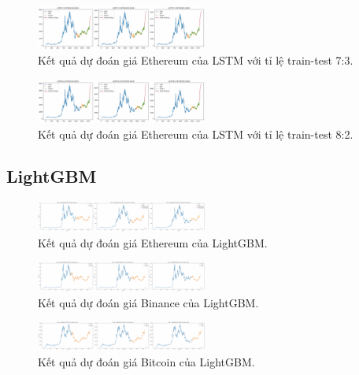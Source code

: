 \documentclass{ieeeojies}
\begin{document}
\begin{figure}[h]
    \centering
    \includegraphics[width=0.5\textwidth]{bibliography/pictures/LSTM 73 ETH.jpg}
    \caption{Kết quả dự đoán giá Ethereum của LSTM với tỉ lệ train-test 7:3.}
\end{figure}
\begin{figure}[h]
    \centering
    \includegraphics[width=0.5\textwidth]{bibliography/pictures/LSTM 82 ETH.jpg}
    \caption{Kết quả dự đoán giá Ethereum của LSTM với tỉ lệ train-test 8:2.}
\end{figure}
\subsection{LightGBM}
\begin{figure}[h]
    \centering
    \includegraphics[width=0.5\textwidth]{bibliography/pictures/LIGHTGBM ETH.jpg}
    \caption{Kết quả dự đoán giá Ethereum của LightGBM.}
\end{figure}
\begin{figure}[h]
    \centering
    \includegraphics[width=0.5\textwidth]{bibliography/pictures/LIGHTGBM bnb.jpg}
    \caption{Kết quả dự đoán giá Binance của LightGBM.}
\end{figure}
\begin{figure}[h]
    \centering
    \includegraphics[width=0.5\textwidth]{bibliography/pictures/LIGHTGBM BTC.jpg}
    \caption{Kết quả dự đoán giá Bitcoin của LightGBM.}
\end{figure}
\end{document}
